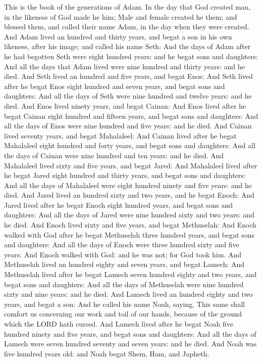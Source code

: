 \begin{biblechapter} %
\verse This is the book of the generations of Adam. In the day that God created man, in the likeness of God made he him;
\verse Male and female created he them; and blessed them, and called their name Adam, in the day when they were created.
\verse And Adam lived an hundred and thirty years, and begat a son in his own likeness, after his image; and called his name Seth:
\verse And the days of Adam after he had begotten Seth were eight hundred years: and he begat sons and daughters:
\verse And all the days that Adam lived were nine hundred and thirty years: and he died.
\verse And Seth lived an hundred and five years, and begat Enos:
\verse And Seth lived after he begat Enos eight hundred and seven years, and begat sons and daughters:
\verse And all the days of Seth were nine hundred and twelve years: and he died.
\verse And Enos lived ninety years, and begat Cainan:
\verse And Enos lived after he begat Cainan eight hundred and fifteen years, and begat sons and daughters:
\verse And all the days of Enos were nine hundred and five years: and he died.
\verse And Cainan lived seventy years, and begat Mahalaleel:
\verse And Cainan lived after he begat Mahalaleel eight hundred and forty years, and begat sons and daughters:
\verse And all the days of Cainan were nine hundred and ten years: and he died.
\verse And Mahalaleel lived sixty and five years, and begat Jared:
\verse And Mahalaleel lived after he begat Jared eight hundred and thirty years, and begat sons and daughters:
\verse And all the days of Mahalaleel were eight hundred ninety and five years: and he died.
\verse And Jared lived an hundred sixty and two years, and he begat Enoch:
\verse And Jared lived after he begat Enoch eight hundred years, and begat sons and daughters:
\verse And all the days of Jared were nine hundred sixty and two years: and he died.
\verse And Enoch lived sixty and five years, and begat Methuselah:
\verse And Enoch walked with God after he begat Methuselah three hundred years, and begat sons and daughters:
\verse And all the days of Enoch were three hundred sixty and five years:
\verse And Enoch walked with God: and he was not; for God took him.
\verse And Methuselah lived an hundred eighty and seven years, and begat Lamech:
\verse And Methuselah lived after he begat Lamech seven hundred eighty and two years, and begat sons and daughters:
\verse And all the days of Methuselah were nine hundred sixty and nine years: and he died.
\verse And Lamech lived an hundred eighty and two years, and begat a son:
\verse And he called his name Noah, saying, This same shall comfort us concerning our work and toil of our hands, because of the ground which the LORD hath cursed.
\verse And Lamech lived after he begat Noah five hundred ninety and five years, and begat sons and daughters:
\verse And all the days of Lamech were seven hundred seventy and seven years: and he died.
\verse And Noah was five hundred years old: and Noah begat Shem, Ham, and Japheth.
\end{biblechapter}

